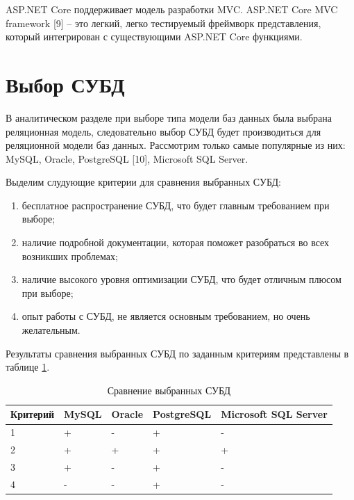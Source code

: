 \documentclass[a4paper,14pt, unknownkeysallowed]{extreport}
\begin{document}
ASP.NET Core поддерживает модель разработки MVC. ASP.NET Core MVC framework [9] -- это легкий, легко тестируемый фреймворк представления, который интегрирован с существующими ASP.NET Core функциями.

\section{Выбор СУБД}

В аналитическом разделе при выборе типа модели баз данных была выбрана реляционная модель, следовательно выбор СУБД будет производиться для реляционной модели баз данных. Рассмотрим только самые популярные из них: MySQL, Oracle, PostgreSQL [10], Microsoft SQL Server.

Выделим слудующие критерии для сравнения выбранных СУБД:

\begin{enumerate}
    \item бесплатное распространение СУБД, что будет главным требованием при выборе;
    \item наличие подробной документации, которая поможет разобраться во всех возникших проблемах;
    \item наличие высокого уровня оптимизации СУБД, что будет отличным плюсом при выборе;
    \item опыт работы с СУБД, не является основным требованием, но очень желательным.
\end{enumerate}

Результаты сравнения выбранных СУБД по заданным критериям представлены в таблице \ref{tbl:compare_DBMS}.

\captionsetup{justification=raggedleft,singlelinecheck=off}
\begin{table}[H]
    \centering
	\caption{Сравнение выбранных СУБД}
    \label{tbl:compare_DBMS}
	\begin{tabular}{|l|l|l|l|l|}
        \hline
        \textbf{Критерий} & \textbf{MySQL} & \textbf{Oracle} & \textbf{PostgreSQL} & \textbf{Microsoft SQL Server} \\ \hline

        1 & + & - & + & - \\ \hline
        2 & + & + & + & + \\ \hline
        3 & + & - & + & - \\ \hline
        4 & - & - & + & - \\ \hline

    \end{tabular}
\end{table}
\end{document}
